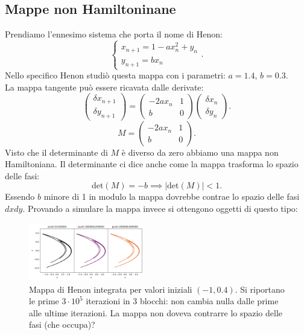 \subsection{Mappe non Hamiltoninane}%
\label{sub:Mappe non Hamiltoninane}
\begin{exmp}
    Prendiamo l'ennesimo sistema che porta il nome di Henon:
    \[
        \begin{cases}
            x_{n+1} = 1 - a x_n^2 + y_n\\
	    y_{n+1} = bx_n
        \end{cases}
    .\] 
    Nello specifico Henon studiò questa mappa con i parametri: $a = 1.4$, $b = 0.3$.\\
    La mappa tangente può essere ricavata dalle derivate:
    \[
        \begin{pmatrix} \delta x_{n+1}\\ \delta y_{n+1} \end{pmatrix} =
	\begin{pmatrix} 
	    -2ax_n & 1 \\
	    b & 0
	\end{pmatrix} 
	\begin{pmatrix} \delta x_n \\ \delta y_n \end{pmatrix} 
    .\] 
    \[
        M = 
	\begin{pmatrix} 
	    -2ax_n & 1 \\
	    b & 0
	\end{pmatrix} 
    .\] 
    Visto che il determinante di $M$ è diverso da zero abbiamo una mappa non Hamiltoniana. Il determinante ci dice anche come la mappa trasforma lo spazio delle fasi:
    \[
	\text{det}(M) = - b \implies  \left|\text{det}(M)\right| < 1 
    .\] 
    Essendo $b$ minore di 1 in modulo la mappa dovrebbe contrae lo spazio delle fasi $dxdy$. Provando a simulare la mappa invece si ottengono oggetti di questo tipo:
    \begin{figure}[H]
        \centering
	\includegraphics[width=0.45\textwidth]{figures/22_henonmap.png}
	\caption{\scriptsize Mappa di Henon integrata per valori iniziali $(-1, 0.4)$. Si riportano le prime $3\cdot 10^{5}$ iterazioni in 3 blocchi: non cambia nulla dalle prime alle ultime iterazioni. La mappa non doveva contrarre lo spazio delle fasi (che occupa)?}
        \label{fig:figures-22_henonmap-png}
    \end{figure}
\end{exmp}
